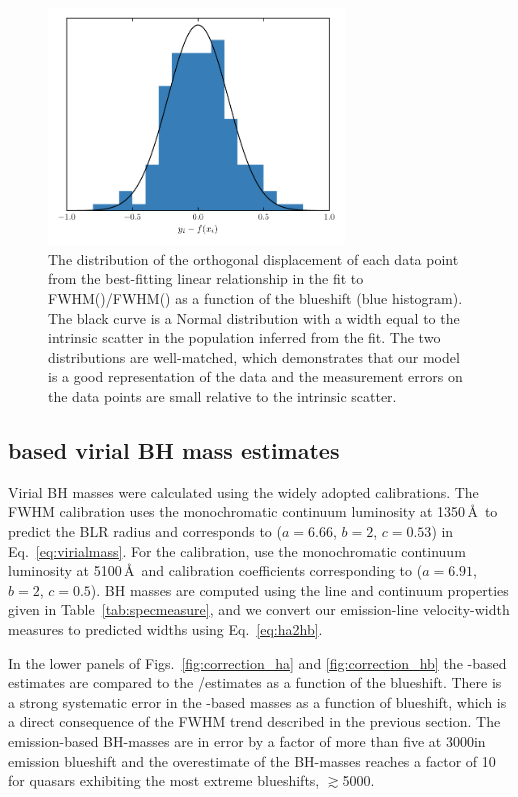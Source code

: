 \begin{figure}
    \centering 
    \includegraphics[width=0.7\textwidth]{figures/chapter03/intrinsic_scatter.pdf} 
    \caption{The distribution of the orthogonal displacement of each data point from the best-fitting linear relationship in the fit to FWHM()/FWHM(\hans) as a function of the  blueshift (blue histogram). The black curve is a Normal distribution with a width equal to the intrinsic scatter in the population inferred from the fit. The two distributions are well-matched, which demonstrates that our model is a good representation of the data and the measurement errors on the data points are small relative to the intrinsic scatter.} 
    \label{fig:intrinsic_scatter}
\end{figure}

\subsection{ based virial BH mass estimates}

Virial BH masses were calculated using the widely adopted \citet{vestergaard06} calibrations. 
The \citet{vestergaard06}  FWHM calibration uses the monochromatic continuum luminosity at 1350\,\AA\, to predict the BLR radius and corresponds to ($a=6.66$, $b=2$, $c=0.53$) in Eq.~\ref{eq:virialmass}. 
For the \hb calibration, \citet{vestergaard06} use the monochromatic continuum luminosity at 5100\,\AA\, and calibration coefficients corresponding to ($a=6.91$, $b=2$, $c=0.5$).
BH masses are computed using the line and continuum properties given in Table~\ref{tab:specmeasure}, and we convert our \ha emission-line velocity-width measures to predicted \hb widths using Eq.~\ref{eq:ha2hb}.

In the lower panels of Figs.~\ref{fig:correction_ha} and \ref{fig:correction_hb} the -based estimates are compared to the \hans/\hb estimates as a function of the  blueshift. 
There is a strong systematic error in the -based masses as a function of blueshift, which is a direct consequence of the FWHM trend described in the previous section. 
The  emission-based BH-masses are in error by a factor of more than five at 3000\kms in  emission blueshift and the overestimate of the BH-masses reaches a factor of 10 for quasars exhibiting the most extreme blueshifts, $\gtrsim$5000\kms. 

